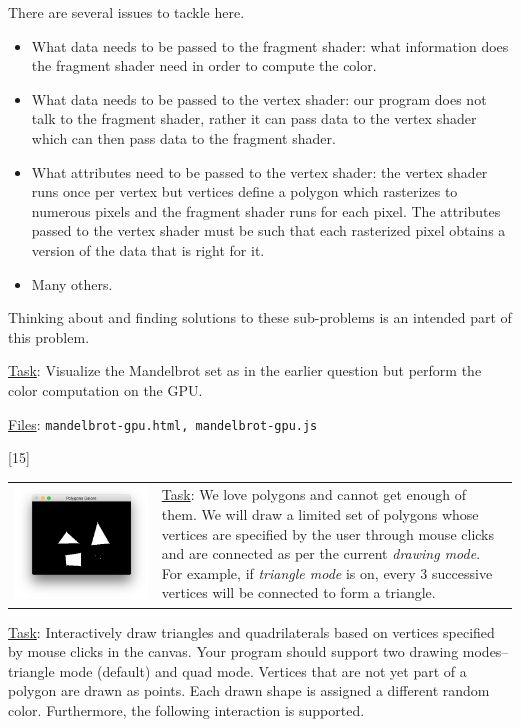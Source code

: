 \documentclass[addpoints]{exam}
\begin{document}
\begin{questions}
  There are several issues to tackle here.
  \begin{itemize}
  \item What data needs to be passed to the fragment shader: what information does the fragment shader need in order to compute the color.
  \item What data needs to be passed to the vertex shader: our program does not talk to the fragment shader, rather it can pass data to the vertex shader which can then pass data to the fragment shader.
  \item What attributes need to be passed to the vertex shader: the vertex shader runs once per vertex but vertices define a polygon which rasterizes to numerous pixels and the fragment shader runs for each pixel. The attributes passed to the vertex shader must be such that each rasterized pixel obtains a version of the data that is right for it.
  \item Many others.
  \end{itemize}
  Thinking about and finding solutions to these sub-problems is an intended part of this problem.
  
  \underline{Task}: Visualize the Mandelbrot set as in the earlier question but perform the color computation on the GPU.
  
  \underline{Files}: \texttt{mandelbrot-gpu.html, mandelbrot-gpu.js}

  
[15]
  \label{q:galore}
  
  \begin{tabularx}{\linewidth}{lX}
    \includegraphics[width=.3\textwidth,align=t]{galore}
    &
      \vspace{20pt} \underline{Task}: We love polygons and cannot get enough of them. We will draw a limited set of polygons whose vertices are specified by the user through mouse clicks and are connected as per the current \textit{drawing mode}. For example, if \textit{triangle mode} is on, every 3 successive vertices will be connected to form a triangle.
  \end{tabularx}
  
  \underline{Task}: Interactively draw triangles and quadrilaterals based on vertices specified by mouse clicks in the canvas. Your program should support two drawing modes--triangle mode (default) and quad mode. Vertices that are not yet part of a polygon are drawn as points. Each drawn shape is assigned a different random color. Furthermore, the following interaction is supported.
  \begin{parts}

\end{parts}
\end{questions}
\end{document}
